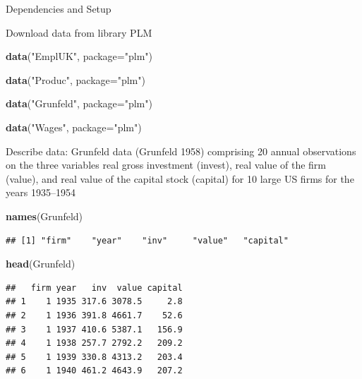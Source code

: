 \documentclass[
]{book}
\newenvironment{Shaded}{\begin{snugshade}}{\end{snugshade}}
\newcommand{\AttributeTok}[1]{\textcolor[rgb]{0.13,0.29,0.53}{#1}}
\newcommand{\CommentTok}[1]{\textcolor[rgb]{0.56,0.35,0.01}{\textit{#1}}}
\newcommand{\FunctionTok}[1]{\textcolor[rgb]{0.13,0.29,0.53}{\textbf{#1}}}
\newcommand{\NormalTok}[1]{#1}
\newcommand{\OtherTok}[1]{\textcolor[rgb]{0.56,0.35,0.01}{#1}}
\newcommand{\SpecialCharTok}[1]{\textcolor[rgb]{0.81,0.36,0.00}{\textbf{#1}}}
\newcommand{\StringTok}[1]{\textcolor[rgb]{0.31,0.60,0.02}{#1}}
\begin{document}
Dependencies and Setup

Download data from library PLM

\begin{Shaded}
\begin{Highlighting}[]
\FunctionTok{data}\NormalTok{(}\StringTok{"EmplUK"}\NormalTok{, }\AttributeTok{package=}\StringTok{"plm"}\NormalTok{)}

\FunctionTok{data}\NormalTok{(}\StringTok{"Produc"}\NormalTok{, }\AttributeTok{package=}\StringTok{"plm"}\NormalTok{)}

\FunctionTok{data}\NormalTok{(}\StringTok{"Grunfeld"}\NormalTok{, }\AttributeTok{package=}\StringTok{"plm"}\NormalTok{)}

\FunctionTok{data}\NormalTok{(}\StringTok{"Wages"}\NormalTok{, }\AttributeTok{package=}\StringTok{"plm"}\NormalTok{)}
\end{Highlighting}
\end{Shaded}

Describe data: Grunfeld data (Grunfeld 1958) comprising 20 annual observations on the three variables real gross investment (invest), real value of the firm (value), and real value of the capital stock (capital) for 10 large US firms for the years 1935--1954

\begin{Shaded}
\begin{Highlighting}[]
\FunctionTok{names}\NormalTok{(Grunfeld)}
\end{Highlighting}
\end{Shaded}

\begin{verbatim}
## [1] "firm"    "year"    "inv"     "value"   "capital"
\end{verbatim}

\begin{Shaded}
\begin{Highlighting}[]
\FunctionTok{head}\NormalTok{(Grunfeld)}
\end{Highlighting}
\end{Shaded}

\begin{verbatim}
##   firm year   inv  value capital
## 1    1 1935 317.6 3078.5     2.8
## 2    1 1936 391.8 4661.7    52.6
## 3    1 1937 410.6 5387.1   156.9
## 4    1 1938 257.7 2792.2   209.2
## 5    1 1939 330.8 4313.2   203.4
## 6    1 1940 461.2 4643.9   207.2
\end{verbatim}

\begin{Shaded}
\end{Shaded}
\end{document}
